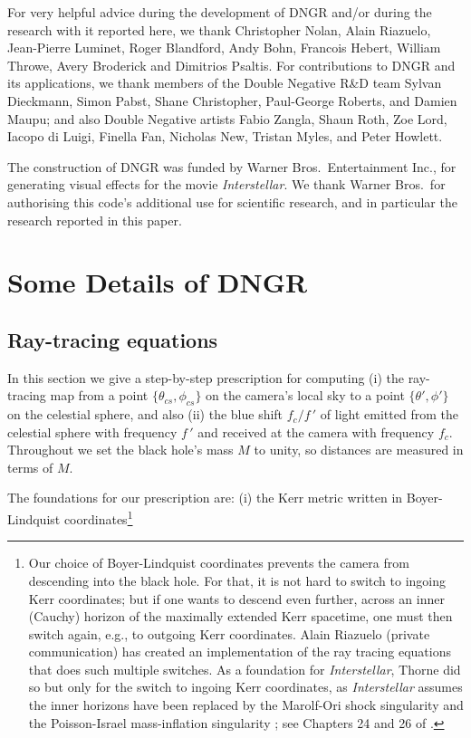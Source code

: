 \documentclass[12pt]{iopart}
\begin{document}
\ack

For very helpful advice during the development of DNGR and/or during the research with it
reported here, we thank  Christopher Nolan, Alain Riazuelo, Jean-Pierre Luminet, Roger Blandford, Andy Bohn, Francois Hebert, William Throwe, Avery Broderick and Dimitrios Psaltis.  
For contributions to DNGR and its applications, we thank  members of the Double Negative R\&D team
Sylvan Dieckmann, Simon Pabst, Shane Christopher, Paul-George Roberts, and Damien Maupu; and also Double Negative artists
Fabio Zangla, Shaun Roth, Zoe Lord, Iacopo di Luigi, Finella Fan, Nicholas New, Tristan Myles, and Peter Howlett.

The construction of   DNGR was funded by Warner Bros.\ Entertainment Inc., for generating visual effects for the movie \emph{Interstellar}.  We thank Warner Bros.\ for authorising this code's additional use for scientific research, and in particular the
research reported in this paper.

\appendix

\section{Some Details of DNGR}
\label{sec:App}

\subsection{Ray-tracing equations}
\label{subsec:App-RayTrace}

In this section we give a step-by-step prescription for computing (i)  the ray-tracing map
from a point $\{\theta_{cs}, \phi_{cs}\}$ on the camera's local sky to a point $\{\theta',
\phi'\}$ on the celestial sphere, and also (ii) the  blue shift $f_c/f\,'$ of light emitted from the celestial sphere with frequency $f\,'$ and received at the camera with frequency $f_c$.
Throughout we set the black hole's
mass $M$ to unity, so distances are measured in terms of $M$.

The foundations for our prescription are: (i) the Kerr metric written in Boyer-Lindquist coordinates\footnote{Our choice of Boyer-Lindquist coordinates prevents the camera from descending into the black hole.  For that, it is not hard to switch to ingoing Kerr coordinates; but if one wants to descend even further, across an inner (Cauchy) horizon of the maximally extended Kerr spacetime, one must then switch again, e.g., to outgoing Kerr coordinates.  Alain Riazuelo (private communication) has created an implementation of the ray tracing equations that does such multiple switches.  As a foundation for \emph{Interstellar}, Thorne did so but only for the switch to ingoing Kerr
coordinates, as  \emph{Interstellar} assumes the inner horizons have been replaced by the Marolf-Ori shock singularity \cite{Marolf-Ori}
and the Poisson-Israel mass-inflation singularity \cite{Poisson-Israel}; see Chapters
24 and 26 of \cite{TSI}.}
\end{document}
